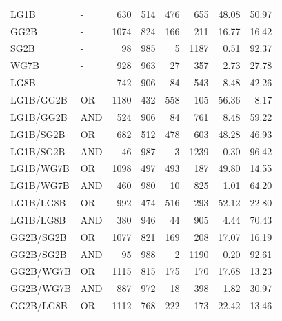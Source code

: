 \documentclass{article}
\begin{document}
{\begin{longtable}{llrrrrrr}
LG1B                     & -       &  630 &  514 &  476 &  655 & 48.08             & 50.97             \\
 GG2B                     & -       & 1074 &  824 &  166 &  211 & 16.77             & 16.42             \\
 SG2B                     & -       &   98 &  985 &    5 & 1187 & 0.51              & 92.37             \\
 WG7B                     & -       &  928 &  963 &   27 &  357 & 2.73              & 27.78             \\
 LG8B                     & -       &  742 &  906 &   84 &  543 & 8.48              & 42.26             \\
 LG1B/GG2B                & OR      & 1180 &  432 &  558 &  105 & 56.36             & 8.17              \\
 LG1B/GG2B                & AND     &  524 &  906 &   84 &  761 & 8.48              & 59.22             \\
 LG1B/SG2B                & OR      &  682 &  512 &  478 &  603 & 48.28             & 46.93             \\
 LG1B/SG2B                & AND     &   46 &  987 &    3 & 1239 & 0.30              & 96.42             \\
 LG1B/WG7B                & OR      & 1098 &  497 &  493 &  187 & 49.80             & 14.55             \\
 LG1B/WG7B                & AND     &  460 &  980 &   10 &  825 & 1.01              & 64.20             \\
 LG1B/LG8B                & OR      &  992 &  474 &  516 &  293 & 52.12             & 22.80             \\
 LG1B/LG8B                & AND     &  380 &  946 &   44 &  905 & 4.44              & 70.43             \\
 GG2B/SG2B                & OR      & 1077 &  821 &  169 &  208 & 17.07             & 16.19             \\
 GG2B/SG2B                & AND     &   95 &  988 &    2 & 1190 & 0.20              & 92.61             \\
 GG2B/WG7B                & OR      & 1115 &  815 &  175 &  170 & 17.68             & 13.23             \\
 GG2B/WG7B                & AND     &  887 &  972 &   18 &  398 & 1.82              & 30.97             \\
 GG2B/LG8B                & OR      & 1112 &  768 &  222 &  173 & 22.42             & 13.46             \\

\end{longtable}}
\end{document}
